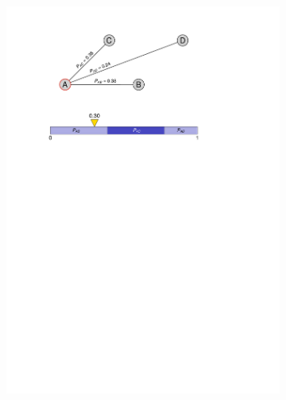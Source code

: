 \documentclass[pdftex,
               12pt,
               DIV=12,
               a4paper,
               twoside,
               parskip=half,
               abstract=true,
               dvipsnames]{scrartcl}
\begin{document}
\begin{figure}[ht]
\begin{subfigure}{0.45\textwidth}
		\includegraphics[width=\linewidth, page=2]{aco_probabilities}
		\caption{} \label{subfig:ACO_wahrscheinlichkeiten_b}
	\end{subfigure}\newline
	\begin{subfigure}{0.55\textwidth}

\end{subfigure}
\end{figure}
\end{document}
